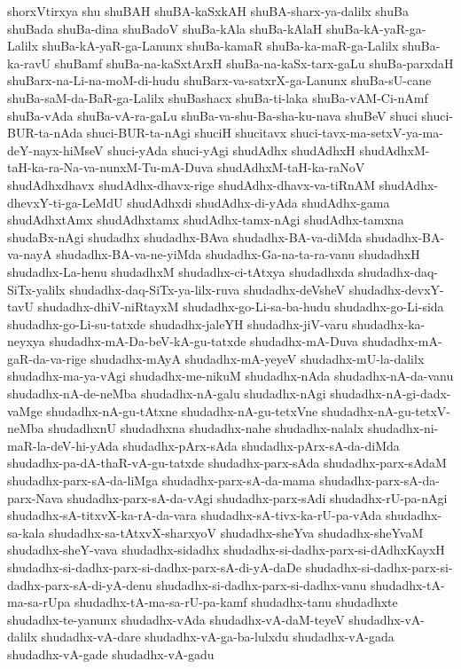 {shorxVtirxya
shu
shuBAH
shuBA-kaSxkAH
shuBA-sharx-ya-dalilx
shuBa
shuBada
shuBa-dina
shuBadoV
shuBa-kAla
shuBa-kAlaH
shuBa-kA-yaR-ga-Lalilx
shuBa-kA-yaR-ga-Lanunx
shuBa-kamaR
shuBa-ka-maR-ga-Lalilx
shuBa-ka-ravU
shuBamf
shuBa-na-kaSxtArxH
shuBa-na-kaSx-tarx-gaLu
shuBa-parxdaH
shuBarx-na-Li-na-moM-di-hudu
shuBarx-va-satxrX-ga-Lanunx
shuBa-sU-cane
shuBa-saM-da-BaR-ga-Lalilx
shuBashacx
shuBa-ti-laka
shuBa-vAM-Ci-nAmf
shuBa-vAda
shuBa-vA-ra-gaLu
shuBa-va-shu-Ba-sha-ku-nava
shuBeV
shuci
shuci-BUR-ta-nAda
shuci-BUR-ta-nAgi
shuciH
shucitavx
shuci-tavx-ma-setxV-ya-ma-deY-nayx-hiMseV
shuci-yAda
shuci-yAgi
shudAdhx
shudAdhxH
shudAdhxM-taH-ka-ra-Na-va-nunxM-Tu-mA-Duva
shudAdhxM-taH-ka-raNoV
shudAdhxdhavx
shudAdhx-dhavx-rige
shudAdhx-dhavx-va-tiRnAM
shudAdhx-dhevxY-ti-ga-LeMdU
shudAdhxdi
shudAdhx-di-yAda
shudAdhx-gama
shudAdhxtAmx
shudAdhxtamx
shudAdhx-tamx-nAgi
shudAdhx-tamxna
shudaBx-nAgi
shudadhx
shudadhx-BAva
shudadhx-BA-va-diMda
shudadhx-BA-va-nayA
shudadhx-BA-va-ne-yiMda
shudadhx-Ga-na-ta-ra-vanu
shudadhxH
shudadhx-La-henu
shudadhxM
shudadhx-ci-tAtxya
shudadhxda
shudadhx-daq-SiTx-yalilx
shudadhx-daq-SiTx-ya-lilx-ruva
shudadhx-deVsheV
shudadhx-devxY-tavU
shudadhx-dhiV-niRtayxM
shudadhx-go-Li-sa-ba-hudu
shudadhx-go-Li-sida
shudadhx-go-Li-su-tatxde
shudadhx-jaleYH
shudadhx-jiV-varu
shudadhx-ka-neyxya
shudadhx-mA-Da-beV-kA-gu-tatxde
shudadhx-mA-Duva
shudadhx-mA-gaR-da-va-rige
shudadhx-mAyA
shudadhx-mA-yeyeV
shudadhx-mU-la-dalilx
shudadhx-ma-ya-vAgi
shudadhx-me-nikuM
shudadhx-nAda
shudadhx-nA-da-vanu
shudadhx-nA-de-neMba
shudadhx-nA-galu
shudadhx-nAgi
shudadhx-nA-gi-dadx-vaMge
shudadhx-nA-gu-tAtxne
shudadhx-nA-gu-tetxVne
shudadhx-nA-gu-tetxV-neMba
shudadhxnU
shudadhxna
shudadhx-nahe
shudadhx-nalalx
shudadhx-ni-maR-la-deV-hi-yAda
shudadhx-pArx-sAda
shudadhx-pArx-sA-da-diMda
shudadhx-pa-dA-thaR-vA-gu-tatxde
shudadhx-parx-sAda
shudadhx-parx-sAdaM
shudadhx-parx-sA-da-liMga
shudadhx-parx-sA-da-mama
shudadhx-parx-sA-da-parx-Nava
shudadhx-parx-sA-da-vAgi
shudadhx-parx-sAdi
shudadhx-rU-pa-nAgi
shudadhx-sA-titxvX-ka-rA-da-vara
shudadhx-sA-tivx-ka-rU-pa-vAda
shudadhx-sa-kala
shudadhx-sa-tAtxvX-sharxyoV
shudadhx-sheYva
shudadhx-sheYvaM
shudadhx-sheY-vava
shudadhx-sidadhx
shudadhx-si-dadhx-parx-si-dAdhxKayxH
shudadhx-si-dadhx-parx-si-dadhx-parx-sA-di-yA-daDe
shudadhx-si-dadhx-parx-si-dadhx-parx-sA-di-yA-denu
shudadhx-si-dadhx-parx-si-dadhx-vanu
shudadhx-tA-ma-sa-rUpa
shudadhx-tA-ma-sa-rU-pa-kamf
shudadhx-tanu
shudadhxte
shudadhx-te-yanunx
shudadhx-vAda
shudadhx-vA-daM-teyeV
shudadhx-vA-dalilx
shudadhx-vA-dare
shudadhx-vA-ga-ba-lulxdu
shudadhx-vA-gada
shudadhx-vA-gade
shudadhx-vA-gadu
}
